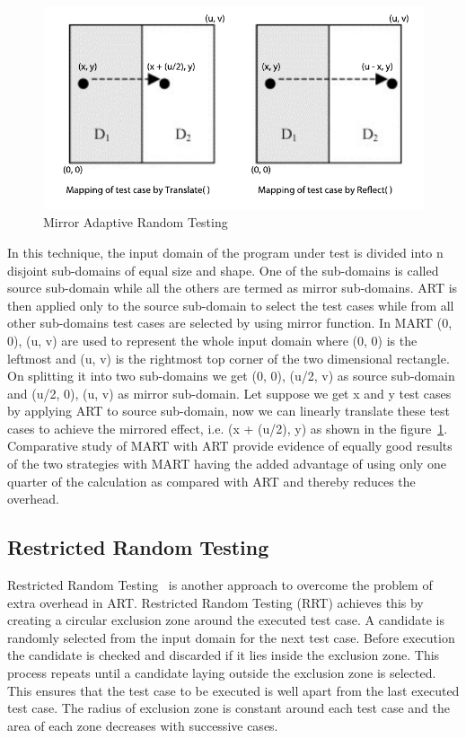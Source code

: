 \begin{figure}[h]
\begin{center}
	\includegraphics[width=13cm, height=6cm ]{chapter3/mart2.pdf}
	\caption{Mirror Adaptive Random Testing~\cite{Chen2003}}
\label{fig:mirrorART}
\end{center}  
\end{figure}

In this technique, the input domain of the program under test is divided into n disjoint sub-domains of equal size and shape. One of the sub-domains is called source sub-domain while all the others are termed as mirror sub-domains. ART is then applied only to the source sub-domain to select the test cases while from all other sub-domains test cases are selected by using mirror function. In MART {(0, 0), (u, v)} are used to represent the whole input domain where (0, 0) is the leftmost and (u, v) is the rightmost top corner of the two dimensional rectangle. On splitting it into two sub-domains we get {(0, 0), (u/2, v)} as source sub-domain and {(u/2, 0), (u, v)} as mirror sub-domain. Let suppose we get x and y test cases by applying ART to source sub-domain, now we can linearly translate these test cases to achieve the mirrored effect, i.e. (x + (u/2), y) as shown in the figure~\ref{fig:mirrorART}. Comparative study of MART with ART provide evidence of equally good results of the two strategies with MART having the added advantage of using only one quarter of the calculation as compared with ART and thereby reduces the overhead.


\subsection{Restricted Random Testing}
Restricted Random Testing~\cite{chan2003normalized} is another approach to overcome the problem of extra overhead in ART. Restricted Random Testing (RRT) achieves this by creating a circular exclusion zone around the executed test case. A candidate is randomly selected from the input domain for the next test case. Before execution the candidate is checked and discarded if it lies inside the exclusion zone. This process repeats until a candidate laying outside the exclusion zone is selected. This ensures that the test case to be executed is well apart from the last executed test case. The radius of exclusion zone is constant around each test case and the area of each zone decreases with successive cases.


